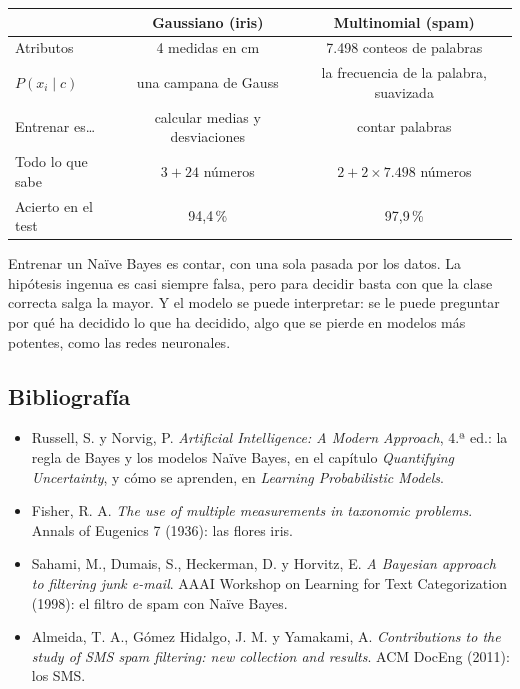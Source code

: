 \documentclass{article}
\begin{document}
\begin{exercise}[breakable]
\begin{enumerate}
\end{enumerate}
\end{exercise}


\begin{idea}[title=\textbf{Para terminar}]
\centering
\small
\begin{tabular}{lcc}
\toprule
 & Gaussiano (iris) & Multinomial (spam) \\
\midrule
Atributos & 4 medidas en cm & 7.498 conteos de palabras \\
$P(x_i \mid c)$ & una campana de Gauss & la frecuencia de la palabra, suavizada \\
Entrenar es\dots & calcular medias y desviaciones & contar palabras \\
Todo lo que sabe & $3 + 24$ números & $2 + 2 \times 7.498$ números \\
Acierto en el test & 94,4\,\% & 97,9\,\% \\
\bottomrule
\end{tabular}

\raggedright
\medskip
Entrenar un Naïve Bayes es contar, con una sola pasada por los datos. La hipótesis ingenua es casi siempre falsa, pero para decidir basta con que la clase correcta salga la mayor. Y el modelo se puede interpretar: se le puede preguntar por qué ha decidido lo que ha decidido, algo que se pierde en modelos más potentes, como las redes neuronales.
\end{idea}

\subsection*{Bibliografía}
\begin{itemize}\small\setlength{\itemsep}{1pt}
    \item Russell, S. y Norvig, P. \textit{Artificial Intelligence: A Modern Approach}, 4.ª ed.: la regla de Bayes y los modelos Naïve Bayes, en el capítulo \textit{Quantifying Uncertainty}, y cómo se aprenden, en \textit{Learning Probabilistic Models}.
    \item Fisher, R. A. \textit{The use of multiple measurements in taxonomic problems}. Annals of Eugenics 7 (1936): las flores iris.
    \item Sahami, M., Dumais, S., Heckerman, D. y Horvitz, E. \textit{A Bayesian approach to filtering junk e-mail}. AAAI Workshop on Learning for Text Categorization (1998): el filtro de spam con Naïve Bayes.
    \item Almeida, T. A., Gómez Hidalgo, J. M. y Yamakami, A. \textit{Contributions to the study of SMS spam filtering: new collection and results}. ACM DocEng (2011): los SMS.
\end{itemize}
\end{document}
